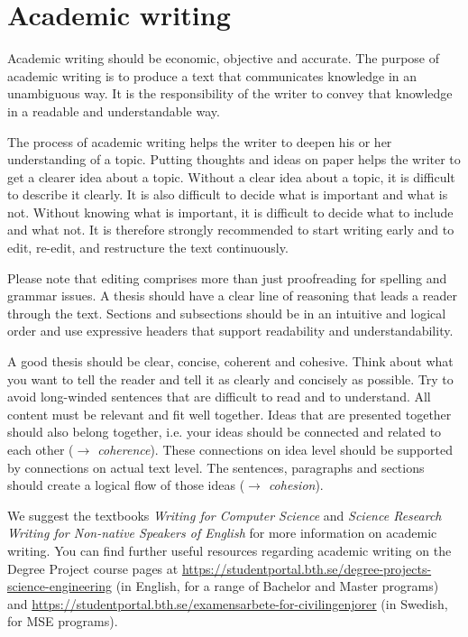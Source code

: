 \documentclass[a4paper,12pt]{book}
\begin{document}


\chapter{Academic writing}
\label{chp:academic-writing}
%
Academic writing should be economic, objective and accurate. 
The purpose of academic writing is to produce a text that communicates
knowledge in an unambiguous way. It is the responsibility of the writer to
convey that knowledge in a readable and understandable way.

The process of academic writing helps the writer to deepen his or her
understanding of a topic. Putting thoughts and ideas on paper helps the writer to
get a clearer idea about a topic. Without a clear idea about a topic,
it is difficult to describe it clearly. It is also difficult to decide what
is important and what is not. Without knowing what is important, it is difficult
to decide what to include and what not. It is therefore strongly recommended
to start writing early and to edit, re-edit, and restructure the text
continuously.

Please note that editing comprises more than just proofreading for spelling
and grammar issues. A thesis should have a clear line of reasoning that leads
a reader through the text. Sections and
subsections should be in an intuitive and logical order and use expressive
headers that support readability and understandability.

A good thesis should be clear, concise, coherent and cohesive. 
Think about what you want to tell the reader and tell it as clearly and
concisely as possible. Try to avoid long-winded sentences that are
difficult to read and to understand. All content must be relevant and fit well together. Ideas that are presented together
should also belong together, i.e. your ideas should be connected and
related to each other (\emph{$\rightarrow$ coherence}). These
connections on idea level should be supported by connections on
actual text level. The sentences, paragraphs and sections should
create a logical flow of those ideas (\emph{$\rightarrow$ cohesion}).

We suggest the textbooks \textit{Writing for Computer Science}
\cite{zobel2014writing} and \textit{Science Research Writing for Non-native Speakers of English} \cite{Glasman2021science} for more information on academic writing. You can
find further useful resources regarding academic writing on the Degree Project course pages at
\url{https://studentportal.bth.se/degree-projects-science-engineering}
(in English, for a range of Bachelor and Master programs)
and \url{https://studentportal.bth.se/examensarbete-for-civilingenjorer}
(in Swedish, for MSE programs).
\end{document}
